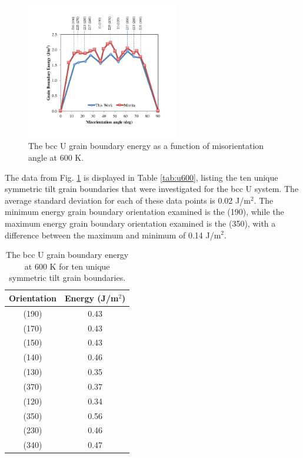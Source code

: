 \documentclass[review]{elsarticle}
\begin{document}
\begin{figure}[h]
 \centering
 \includegraphics[width=0.6\textwidth]{u600B.png} 
 \caption{The bcc U grain boundary energy as a function of misorientation angle at 600 K.}
 \label{fig:u600}
\end{figure}

The data from Fig. \ref{fig:u600} is displayed in Table \ref{tab:u600}, listing the ten unique symmetric tilt grain boundaries that were investigated for the bcc U system. The average standard deviation for each of these data points is 0.02 J/m$^{2}$. The minimum energy grain boundary orientation examined is the (190), while the maximum energy grain boundary orientation examined is the (350), with a difference between the maximum and minimum of 0.14 J/m$^{2}$. 

\begin{table}[h]
\caption{The bcc U grain boundary energy at 600 K for ten unique symmetric tilt grain boundaries.} \label{tab:u600}
\begin{center}
\begin{tabular}{|c|c|}
	\hline
	Orientation & Energy (J/m$^{2}$) \\
	 \hline
	 (190) & 0.43 \\
	 (170) & 0.43 \\
	 (150) & 0.43 \\
	 (140) & 0.46 \\
	 (130) & 0.35 \\	 
	 (370) & 0.37 \\
	 (120) & 0.34 \\
	 (350) & 0.56 \\
	 (230) & 0.46 \\
	 (340) & 0.47 \\
	 \hline
\end{tabular}
\end{center}
\label{default}
\end{table}
\end{document}
